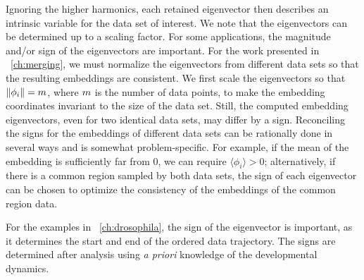 Ignoring the higher harmonics, each retained eigenvector then describes an intrinsic variable for the data set of interest.
%
We note that the eigenvectors can be determined up to a scaling factor.
%
For some applications, the magnitude and/or sign of the eigenvectors are important. 
%
For the work presented in \chap~\ref{ch:merging}, we must normalize the eigenvectors from different data sets so that the resulting embeddings are consistent.
%
We first scale the eigenvectors so that $\|\phi_i\| = m$, where $m$ is the number of data points,
to make the embedding coordinates invariant to the size of the data set.
%
Still, the computed embedding eigenvectors, even for two identical data sets, may differ by a sign.
%
Reconciling the signs for the embeddings of different data sets can be rationally done in several ways and is somewhat problem-specific.
%
For example, if the mean of the embedding is sufficiently far from 0, we can require $\langle \phi_i \rangle > 0$;
alternatively, if there is a common region sampled by both data sets, the sign of each eigenvector can be chosen to optimize the consistency of the embeddings of the common region data.
%

For the examples in \chap~\ref{ch:drosophila}, the sign of the eigenvector is important, as it determines the start and end of the ordered data trajectory.
%
The signs are determined after analysis using {\em a priori} knowledge of the developmental dynamics. 

